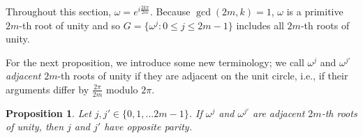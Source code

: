 \documentclass{amsart}
\newtheorem{proposition}{Proposition}
\theoremstyle{definition}
\theoremstyle{remark}
\begin{document}
Throughout this section, $\omega = e^{i\frac{2k\pi}{2m}}$. Because $\gcd(2m,k) =1$, $\omega$ is a primitive $2m$-th root of unity and so $G=\{\omega^j : 0 \leq j \leq 2m-1\}$ includes all $2m$-th roots of unity. 

For the next proposition, we introduce some new terminology; we call $\omega^j$ and $\omega^{j'}$ {\em adjacent} $2m$-th roots of unity if they are adjacent on the unit circle, i.e., if their arguments differ by $\frac{2\pi}{2m}$ modulo $2\pi$. 

\begin{proposition}\label{neighbors}
Let $j,j' \in \{0,1,... 2m-1\}$. If $\omega^{j}$ and $\omega^{j'}$ are adjacent $2m$-th roots of unity, then $j$ and $j'$ have opposite parity.
\end{proposition}
\end{document}
